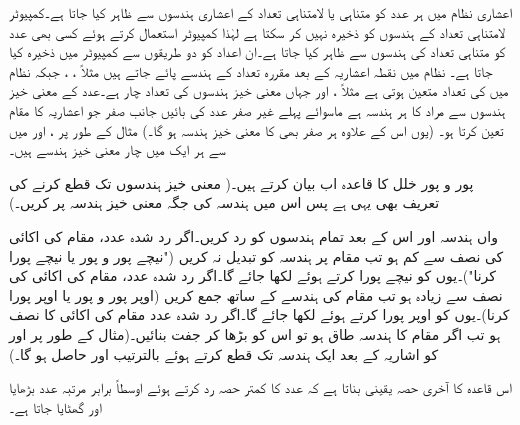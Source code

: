 اعشاری نظام میں ہر عدد کو متناہی یا لامتناہی تعداد کے اعشاری ہندسوں سے ظاہر کیا جاتا ہے۔کمپیوٹر لامتناہی تعداد کے ہندسوں کو ذخیرہ نہیں کر سکتا ہے لہٰذا کمپیوٹر استعمال کرتے ہوئے کسی بھی عدد کو متناہی تعداد کی ہندسوں سے ظاہر کیا جاتا ہے۔ان اعداد کو دو طریقوں سے کمپیوٹر میں  ذخیرہ کیا جاتا ہے۔  نظام میں نقطہ اعشاریہ کے بعد مقررہ تعداد کے ہندسے  پائے جاتے ہیں مثلاً ، ،  جبکہ  نظام میں  کی تعداد متعین ہوتی ہے مثلاً ،  اور  جہاں معنی خیز ہندسوں کی تعداد چار ہے۔عدد  کے معنی خیز ہندسوں سے مراد  کا ہر ہندسہ ہے ماسوائے پہلے غیر صفر عدد کی بائیں جانب صفر جو اعشاریہ کا مقام تعین کرتا ہو۔ (یوں اس کے علاوہ ہر صفر بھی  کا معنی خیز ہندسہ ہو گا۔) مثال کے طور پر ،  اور  میں سے ہر ایک میں چار معنی خیز ہندسے ہیں۔

پور و پور خلل کا قاعدہ اب بیان کرتے ہیں۔( معنی خیز ہندسوں تک قطع کرنے کی تعریف بھی یہی ہے پس اس میں ہندسہ کی جگہ معنی خیز ہندسہ پر کریں۔)

 واں ہندسہ اور اس کے بعد تمام ہندسوں کو رد کریں۔اگر رد شدہ عدد، مقام  کی اکائی کی نصف سے کم ہو تب مقام  پر ہندسہ کو تبدیل نہ کریں ("نیچے پور و پور یا نیچے پورا کرنا")۔یوں  کو نیچے پورا کرتے ہوئے  لکھا جائے گا۔اگر رد شدہ عدد، مقام  کی اکائی کی نصف سے زیادہ ہو تب مقام  کی ہندسے کے ساتھ  جمع کریں (اوپر پور و پور یا اوپر پورا کرنا)۔یوں  کو اوپر پورا کرتے ہوئے  لکھا جائے گا۔اگر رد شدہ عدد مقام  کی اکائی کا نصف ہو تب اگر مقام  کا ہندسہ طاق ہو تو اس کو بڑھا کر جفت بنائیں۔(مثال کے طور پر  اور  کو اشاریہ کے بعد ایک ہندسہ تک قطع کرتے ہوئے بالترتیب  اور  حاصل ہو گا۔)

اس قاعدہ کا آخری حصہ یقینی بناتا ہے کہ  عدد کا کمتر حصہ رد کرتے ہوئے اوسطاً برابر مرتبہ عدد بڑھایا اور گھٹایا جاتا ہے۔ 

